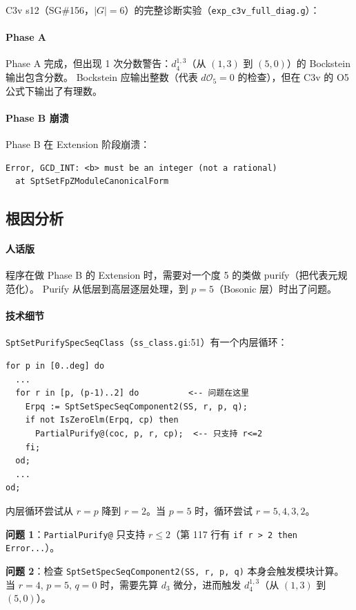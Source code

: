 \documentclass[a4paper,fontset=ubuntu,12pt]{ctexart}
\begin{document}
C3v s12（SG\#156，$|G|=6$）的完整诊断实验（\texttt{exp\_c3v\_full\_diag.g}）：

\paragraph{Phase A}
Phase A 完成，但出现 1 次分数警告：$d_4^{1,3}$（从 $(1,3)$ 到 $(5,0)$）的 Bockstein 输出包含分数。
Bockstein 应输出整数（代表 $d\mathcal{O}_5 = 0$ 的检查），但在 C3v 的 O5 公式下输出了有理数。

\paragraph{Phase B 崩溃}
Phase B 在 Extension 阶段崩溃：
\begin{verbatim}
Error, GCD_INT: <b> must be an integer (not a rational)
  at SptSetFpZModuleCanonicalForm
\end{verbatim}

\subsection{根因分析}
\label{sec:c3v-root-cause}

\paragraph{人话版}
程序在做 Phase B 的 Extension 时，需要对一个度 5 的类做 purify（把代表元规范化）。
Purify 从低层到高层逐层处理，到 $p=5$（Bosonic 层）时出了问题。

\paragraph{技术细节}
\texttt{SptSetPurifySpecSeqClass}（\texttt{ss\_class.gi}:51）有一个内层循环：

\begin{verbatim}
for p in [0..deg] do
  ...
  for r in [p, (p-1)..2] do          <-- 问题在这里
    Erpq := SptSetSpecSeqComponent2(SS, r, p, q);
    if not IsZeroElm(Erpq, cp) then
      PartialPurify@(coc, p, r, cp);  <-- 只支持 r<=2
    fi;
  od;
  ...
od;
\end{verbatim}

内层循环尝试从 $r=p$ 降到 $r=2$。当 $p=5$ 时，循环尝试 $r=5, 4, 3, 2$。

\textbf{问题 1}：\texttt{PartialPurify@} 只支持 $r \le 2$（第 117 行有 \texttt{if r > 2 then Error...}）。

\textbf{问题 2}：检查 \texttt{SptSetSpecSeqComponent2(SS, r, p, q)} 本身会触发模块计算。
当 $r=4$, $p=5$, $q=0$ 时，需要先算 $d_3$ 微分，进而触发 $d_4^{1,3}$（从 $(1,3)$ 到 $(5,0)$）。
\end{document}
